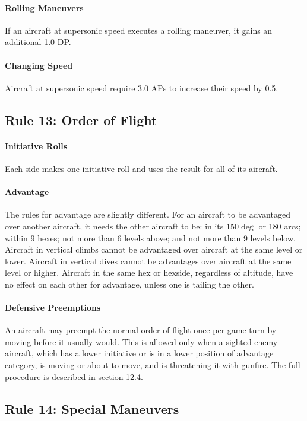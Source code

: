 \documentclass[10pt]{article}
\begin{document}
\paragraph{Rolling Maneuvers} If an aircraft at supersonic speed executes a rolling maneuver, it gains an additional 1.0 DP.

\paragraph{Changing Speed} Aircraft at supersonic speed require 3.0 APs to increase their speed by 0.5.

\subsection{Rule 13: Order of Flight}

\paragraph{Initiative Rolls} Each side makes one initiative roll and uses the result for all of its aircraft.

\paragraph{Advantage} The rules for advantage are slightly different. For an aircraft to be advantaged over another aircraft, it needs the other aircraft to be: in its $150\deg$ or {180\deg} arcs; within 9 hexes; not more than 6 levels above; and not more than 9 levels below. Aircraft in vertical climbs cannot be advantaged over aircraft at the same level or lower. Aircraft in vertical dives cannot be advantages over aircraft at the same level or higher. Aircraft in the same hex or hexside, regardless of altitude, have no effect on each other for advantage, unless one is tailing the other.

\paragraph{Defensive Preemptions} An aircraft may preempt the normal order of flight once per game-turn by moving before it usually would. This is allowed only when a sighted enemy aircraft, which has a lower initiative or is in a lower position of advantage category, is moving or about to move, and is threatening it with gunfire. The full procedure is described in section 12.4.

\subsection{Rule 14: Special Maneuvers}
\end{document}
